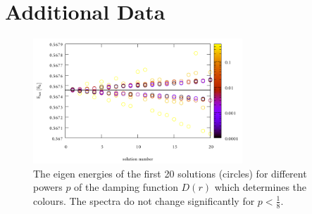 \section{Additional Data}

\begin{figure}
\includegraphics[width=0.7\textwidth]{Figures/IFem_powers_spectra}
\caption{The eigen energies of the first 20 solutions (circles) for different powers $p$ of the damping function $D(r)$ which determines the colours.
The spectra do not change significantly for $p<\frac 18$.}
\label{fig:powerSpect}
\end{figure}

